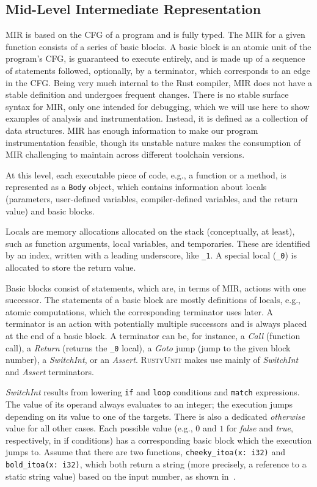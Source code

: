 \documentclass[paper=a4,%
  twoside,%
  BCOR4mm,%
  abstract=true,%
  toc=bibliography,%
  chapterprefix=true,%
  toc=bibliographynumbered,%
  open=right,%
  english,%
  pagesize=pdftex]{scrreprt}
\newcommand{\tech}{\textsc{RustyUnit}\xspace}
\newcommand{\mir}{\ac{MIR}\xspace}
\newcommand{\cfg}{\ac{CFG}\xspace}
\begin{document}
\subsection{Mid-Level Intermediate Representation}
\mir is based on the \cfg of a program and is fully typed. The \mir for a given function consists of a series of basic blocks. A basic block is an atomic unit of the program's \cfg, is guaranteed to execute entirely, and is made up of a sequence of statements followed, optionally, by a terminator, which corresponds to an edge in the \cfg. Being very much internal to the Rust compiler, \mir does not have a stable definition and undergoes frequent changes. There is no stable surface syntax for \mir, only one intended for debugging, which we will use here to show examples of analysis and instrumentation. Instead, it is defined as a collection of data structures. \mir has enough information to make our program instrumentation feasible, though its unstable nature makes the consumption of \mir challenging to maintain across different toolchain versions.

At this level, each executable piece of code, e.g., a function or a method, is represented as a \texttt{Body} object, which contains information about locals (parameters, user-defined variables, compiler-defined variables, and the return value) and basic blocks.

Locals are memory allocations allocated on the stack (conceptually, at least), such as function arguments, local variables, and temporaries. These are identified by an index, written with a leading underscore, like \texttt{\string_1}. A special local (\texttt{\string_0}) is allocated to store the return value. 

Basic blocks consist of statements, which are, in terms of \mir, actions with one successor. The statements of a basic block are mostly definitions of locals, e.g., atomic computations, which the corresponding terminator uses later. A terminator is an action with potentially multiple successors and is always placed at the end of a basic block. A terminator can be, for instance, a \emph{Call} (function call), a \emph{Return} (returns the \texttt{\string_0} local), a \emph{Goto} jump (jump to the given block number), a \emph{SwitchInt}, or an \emph{Assert}. \tech makes use mainly of \emph{SwitchInt} and \emph{Assert} terminators. 

\emph{SwitchInt} results from lowering \texttt{if} and \texttt{loop} conditions and \texttt{match} expressions. The value of its operand always evaluates to an integer; the execution jumps depending on its value to one of the targets. There is also a dedicated \emph{otherwise} value for all other cases. Each possible value (e.g., $0$ and $1$ for \emph{false} and \emph{true}, respectively, in if conditions) has a corresponding basic block which the execution jumps to. Assume that there are two functions, \texttt{cheeky\string_itoa(x: i32)} and \texttt{bold\string_itoa(x: i32)}, which both return a string (more precisely, a reference to a static string value) based on the input number, as shown in~.
\end{document}
